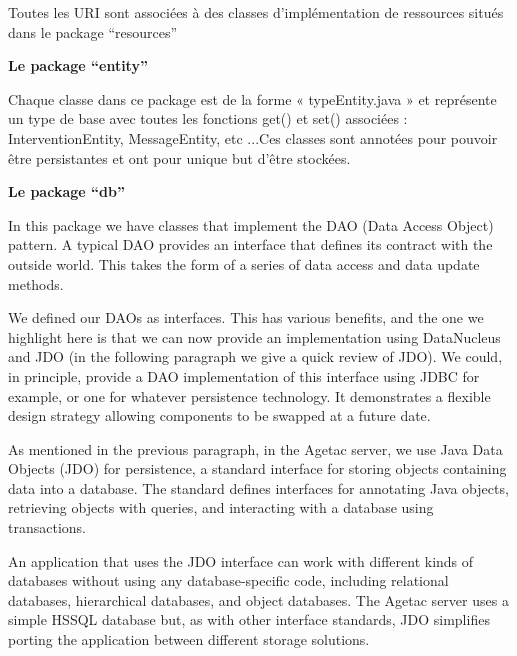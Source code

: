 \documentclass{article}
\begin{document}
{\color{color01} Toutes les URI sont associées à des classes d'implémentation 
de ressources situés dans le package ``resources''}

\vspace{13pt}
{\color{color01} \textbf{Le package ``entity''}}

{\color{color01} Chaque classe dans ce package est de la forme « typeEntity.java 
» et représente un type de base avec toutes les fonctions get() et set() associées 
: InterventionEntity, MessageEntity, etc ...Ces classes sont annotées pour pouvoir 
être persistantes et ont pour unique but d'être stockées.}

\vspace{13pt}
{\color{color01} \textbf{Le package ``db''}}

\vspace{13pt}
{\color{color01} In this package we have classes that implement the DAO (Data Access 
Object) pattern. A typical DAO provides an interface that defines its contract 
with the outside world. This takes the form of a series of data access and data 
update methods. }

\vspace{13pt}
{\color{color01} We defined our DAOs as interfaces. This has various benefits, 
and the one we highlight here is that we can now provide an implementation using 
DataNucleus and JDO (in the following paragraph we give a quick review of JDO). 
We could, in principle, provide a DAO implementation of this interface using JDBC 
for example, or one for whatever persistence technology. It demonstrates a flexible 
design strategy allowing components to be swapped at a future date.}

\vspace{13pt}
{\color{color01} As mentioned in the previous paragraph, in the Agetac server, 
we use Java Data Objects (JDO) for persistence, a standard interface for storing 
objects containing data into a database. The standard defines interfaces for annotating 
Java objects, retrieving objects with queries, and interacting with a database 
using transactions. }

\vspace{13pt}
{\color{color01} An application that uses the JDO interface can work with different 
kinds of databases without using any database-specific code, including relational 
databases, hierarchical databases, and object databases. The Agetac server uses 
a simple HSSQL database but, as with other interface standards, JDO simplifies 
porting the application between different storage solutions.}
\end{document}
